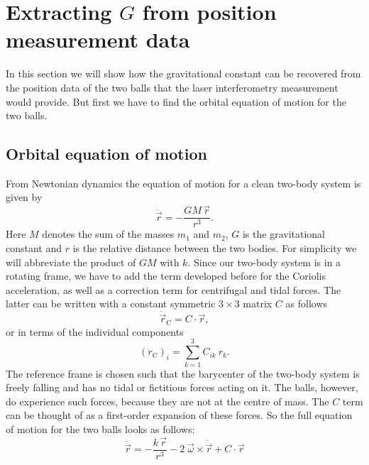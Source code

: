 \documentclass[prb,preprint]{revtex4-1}
\begin{document}
\section{Extracting $G$ from position measurement data}

In this section we will show how the gravitational constant can be
recovered from the position data of the two balls that the laser
interferometry measurement would provide.  But first we have to find
the orbital equation of motion for the two balls.

\subsection{Orbital equation of motion}
From Newtonian dynamics the equation of motion for a clean two-body system is given by 
\begin{equation}
\label{eq:eomeasy}
\ddot{\vec{r}} = - \frac{G M\, \vec{r}}{r^3}.
\end{equation}
Here $M$ denotes the sum of the masses $m_1$ and $m_2$, $G$ is the
gravitational constant and $r$ is the relative distance between the
two bodies. For simplicity we will abbreviate the product of $GM$ with
$k$.  Since our two-body system is in a rotating frame, we have to add
the term developed before for the Coriolis acceleration, as well as a
correction term for centrifugal and tidal forces. The latter can be
written with a constant symmetric $3 \times 3$ matrix $C$ as follows
\begin{equation}
\label{eq:tidal}
\ddot{\vec{r}}_{\mathrm{C}} = C \cdot \vec{r},
\end{equation}
or in terms of the individual components 
\begin{equation}
\label{eq:tidacom}
\left(\ddot{r}_\mathrm{C}\right)_i = \sum_{k=1}^{3} C_{ik} \: r_k.
\end{equation}
The reference frame is chosen such that the barycenter of the two-body
system is freely falling and has no tidal or fictitious forces acting
on it.  The balls, however, do experience such forces, because they
are not at the centre of mass.  The $C$ term can be thought of as a
first-order expansion of these forces.  So the full equation of motion
for the two balls looks as follows:
\begin{equation}
\label{eq:eom}
\ddot{\vec{r}} = - \frac{k\,\vec{r}}{r^3} - 2 \; \vec{\omega} \times \dot{\vec{r}} + C \cdot \vec{r}
\end{equation}
\end{document}
